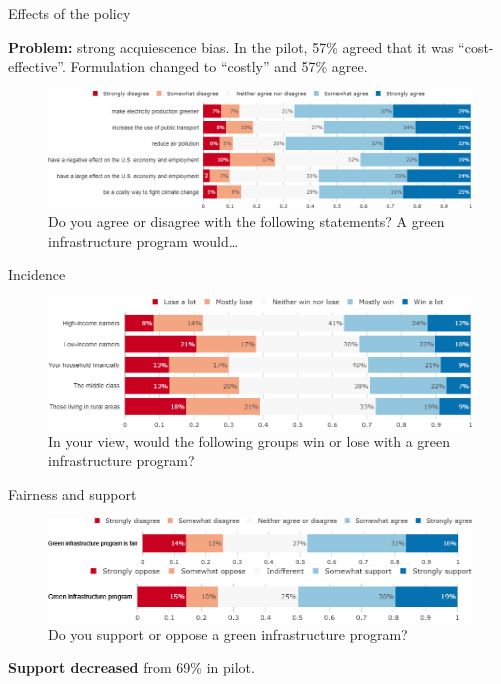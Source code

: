 \documentclass[aspectratio=169,9pt,dvipsnames]{beamer}
\begin{document}
\begin{frame}{Effects of the policy}%

\textbf{Problem:} strong acquiescence bias. In the pilot, 57\% agreed that it was ``cost-effective''. Formulation changed to ``costly'' and 57\% agree.

\begin{figure}[h!]
\centering
\caption{Do you agree or disagree with the following statements? A green infrastructure program would…}
\includegraphics[width=\textwidth]{../figures/US/investments_effect_US.png}
\end{figure}
\end{frame}

\begin{frame}{Incidence}%
\begin{figure}[h!]
\centering
\caption{In your view, would the following groups win or lose with a green infrastructure program?}
\includegraphics[width=\textwidth]{../figures/US/investments_win_lose_US.png}
\end{figure}
\end{frame}

\begin{frame}{Fairness and support}%
\begin{figure}[h!]
\centering
\caption{Do you agree or disagree with the following statement: ``A green infrastructure program mainly financed by public debt is fair."}
\includegraphics[width=\textwidth]{../figures/US/investments_fair_US.png}
\vspace{.5cm}
\centering
\caption{Do you support or oppose a green infrastructure program?}
\includegraphics[width=\textwidth]{../figures/US/investments_support_US.png}
\end{figure}


\textbf{Support decreased} from 69\% in pilot.
\end{frame}
\end{document}
